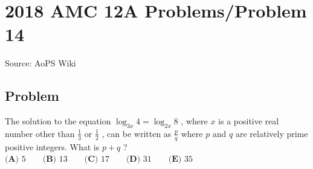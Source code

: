 \documentclass[12pt]{article}
\begin{document}
\section*{{2018 AMC 12A Problems/Problem 14}}
Source: AoPS Wiki

\subsection*{Problem}
The solution to the equation $\log_{3x} 4 = \log_{2x} 8$ , where $x$ is a positive real number other than $\frac{1}{3}$ or $\frac{1}{2}$ , can be written as $\frac {p}{q}$ where $p$ and $q$ are relatively prime positive integers. What is $p + q$ ? $\textbf{(A) } 5 \qquad \textbf{(B) } 13 \qquad \textbf{(C) } 17 \qquad \textbf{(D) } 31 \qquad \textbf{(E) } 35$
\end{document}
